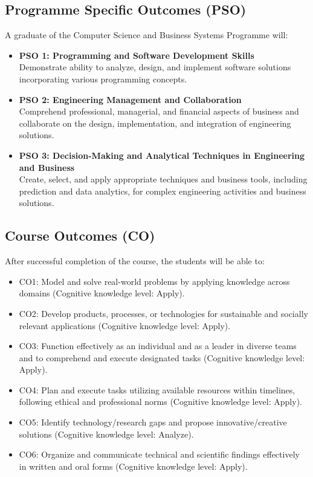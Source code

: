\subsection*{Programme Specific Outcomes (PSO)}

A graduate of the Computer Science and Business Systems Programme will:
\begin{itemize}
	\item \textbf{PSO 1: Programming and Software Development Skills} \\
	      Demonstrate ability to analyze, design, and implement software solutions incorporating various programming concepts.
	\item \textbf{PSO 2: Engineering Management and Collaboration} \\
	      Comprehend professional, managerial, and financial aspects of business and collaborate on the design, implementation, and integration of engineering solutions.
	\item \textbf{PSO 3: Decision-Making and Analytical Techniques in Engineering and Business} \\
	      Create, select, and apply appropriate techniques and business tools, including prediction and data analytics, for complex engineering activities and business solutions.
\end{itemize}

\subsection*{Course Outcomes (CO)}

After successful completion of the course, the students will be able to:
\begin{itemize}
	\item {CO1:} Model and solve real-world problems by applying knowledge across domains (Cognitive knowledge level: Apply).
	\item {CO2:} Develop products, processes, or technologies for sustainable and socially relevant applications (Cognitive knowledge level: Apply).
	\item {CO3:} Function effectively as an individual and as a leader in diverse teams and to comprehend and execute designated tasks (Cognitive knowledge level: Apply).
	\item {CO4:} Plan and execute tasks utilizing available resources within timelines, following ethical and professional norms (Cognitive knowledge level: Apply).
	\item{CO5:} Identify technology/research gaps and propose innovative/creative solutions (Cognitive knowledge level: Analyze).
	\item {CO6:} Organize and communicate technical and scientific findings effectively in written and oral forms (Cognitive knowledge level: Apply).
\end{itemize}